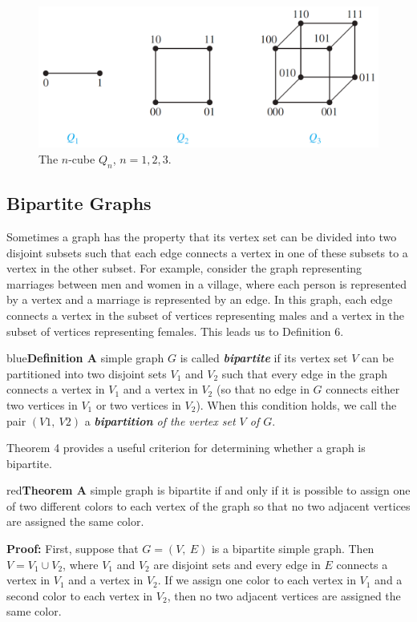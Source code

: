 \documentclass[11pt]{article}
\newenvironment{definition}[1]{\begin{mybox}{blue}{\textbf{Definition #1}}}{\end{mybox}}
\newenvironment{theorem}[1]{\begin{mybox}{red}{\textbf{Theorem #1}}}{\end{mybox}}
\begin{document}
\begin{figure}[h!]
    \centering
    \includegraphics[width=.6\textwidth]{img/ch10.2-figure6.png}
    \caption{The $n$-cube $Q_n$, $n = 1, 2, 3$.}
    \label{fig:my_label}
\end{figure}

\subsection{Bipartite Graphs}

Sometimes a graph has the property that its vertex set can be divided into two disjoint subsets such that each edge connects a vertex in one of these subsets to a vertex in the other subset. For example, consider the graph representing marriages between men and women in a village, where each person is represented by a vertex and a marriage is represented by an edge. In this graph, each edge connects a vertex in the subset of vertices representing males and a vertex in the subset of vertices representing females. This leads us to Definition 6.

\begin{definition}{6}
A simple graph $G$ is called \textit{\textbf{bipartite}} if its vertex set $V$ can be partitioned into two disjoint sets $V_1$ and $V_2$ such that every edge in the graph connects a vertex in $V_1$ and a vertex in $V_2$ (so that no edge in $G$ connects either two vertices in $V_1$ or two vertices in $V_2$). When this condition holds, we call the pair $(V1,\ V2)$ a \textit{\textbf{bipartition} of the vertex set $V$ of $G$}.
\end{definition}

Theorem 4 provides a useful criterion for determining whether a graph is bipartite.

\begin{theorem}{4}
A simple graph is bipartite if and only if it is possible to assign one of two different colors to each vertex of the graph so that no two adjacent vertices are assigned the same color.
\end{theorem}

\textbf{Proof:} First, suppose that $G = (V,\ E)$ is a bipartite simple graph. Then $V = V_1 \cup V_2$, where $V_1$ and $V_2$ are disjoint sets and every edge in $E$ connects a vertex in $V_1$ and a vertex in $V_2$. If we assign one color to each vertex in $V_1$ and a second color to each vertex in $V_2$, then no two
adjacent vertices are assigned the same color.
\end{document}
